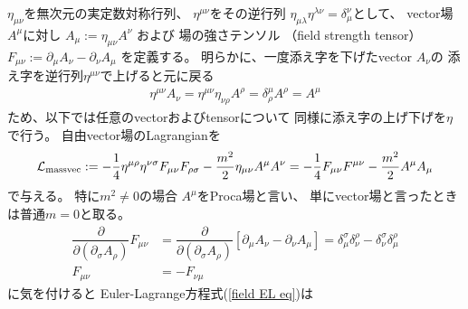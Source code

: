 $\eta_{\mu\nu}$を無次元の実定数対称行列、
$\eta^{\mu\nu}$をその逆行列
$\eta_{\mu\lambda} \eta^{\lambda \nu} = \delta_\mu^\nu$として、
vector場$A^\mu$に対し
$A_\mu := \eta_{\mu\nu} A^\nu$
および
場の強さテンソル
（field strength tensor）
$F_{\mu\nu} :=
\partial_\mu A_\nu
- \partial_\nu A_\mu$
を定義する。
明らかに、一度添え字を下げたvector $A_\nu$の
添え字を逆行列$\eta^{\mu\nu}$で上げると元に戻る
\begin{align}
    \eta^{\mu\nu} A_\nu
    =
    \eta^{\mu\nu} \eta_{\nu \rho} A^\rho
    =
    \delta^\mu_\rho A^\rho
    =
    A^\mu
\end{align}
ため、以下では任意のvectorおよびtensorについて
同様に添え字の上げ下げを$\eta$で行う。
自由vector場のLagrangianを
\begin{align}
    \mathcal{L}_{\rm massvec}
    :=
    -
    \dfrac{1}{4}
        \eta^{\mu\rho}
        \eta^{\nu\sigma}
    F_{\mu\nu} F_{\rho\sigma}
    -
    \dfrac{m^2}{2}
        \eta_{\mu \nu}
        A^\mu A^\nu
=
    - \dfrac{1}{4}
    F_{\mu\nu} F^{\mu\nu}
    -
    \dfrac{m^2}{2}
        A^\mu A_\mu
\end{align}
で与える。
特に$m^2 \neq 0$の場合
$A^\mu$をProca場と言い、
単にvector場と言ったときは普通$m = 0$と取る。
\begin{align}
    \dfrac{\partial}
        {\partial (\partial_\sigma A_\rho)}
    F_{\mu\nu}
    &=
    \dfrac{\partial}
        {\partial (\partial_\sigma A_\rho)}
    \left[
        \partial_\mu A_\nu
        - \partial_\nu A_\mu
    \right]
    =
    \delta_\mu^\sigma
    \delta_\nu^\rho
    -
    \delta_\nu^\sigma
    \delta_\mu^\rho
\\
    F_{\mu\nu} &= - F_{\nu\mu}
\end{align}
に気を付けると
Euler-Lagrange方程式(\ref{field EL eq})は

